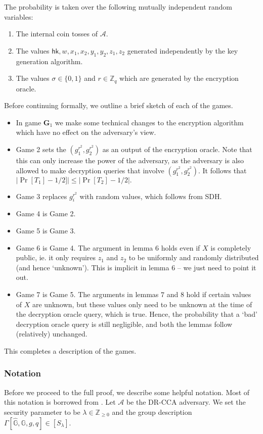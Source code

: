 \documentclass[10pt,a4paper]{article}
\newcommand{\adv}{\mathcal{A}}
\newcommand{\G}{\mathbb{G}}
\newcommand{\hk}{\mathsf{hk}}
\newcommand{\game}{\mathbf{G}}
\newcommand{\Z}{\mathbb{Z}}
\begin{document}
	The probability is taken over the following mutually independent random variables:	\begin{enumerate}
		\item The internal coin tosses of $\adv$.
		\item The values $\hk,w,x_1,x_2,y_1,y_2,z_1,z_2$ generated independently by the key generation algorithm.
		\item The values $\sigma\in\{0,1\}$ and $r\in\Z_q$ which are generated by the encryption oracle.
	\end{enumerate}
	
	Before continuing formally, we outline a brief sketch of each of the games.
	
	\begin{itemize}
		\item In game $\game_1$ we make some technical changes to the encryption algorithm which have no effect on the adversary's view.
		\item Game 2 sets the $(g_1^{r^2}, g_2^{r^2})$ as an output of the encryption oracle. Note that this can only increase the power of the adversary, as the adversary is also allowed to make decryption queries that involve $(g_1^{r^2}, g_2^{r^2})$. It follows that $|\Pr[T_1]-1/2]|\leq|\Pr[T_2]-1/2|.$
		\item Game 3 replaces $g_i^{r^2}$ with random values, which follows from SDH.
		\item Game 4 is Game 2.
		\item Game 5 is Game 3.
		\item Game 6 is Game 4. The argument in lemma $6$ holds even if $X$ is completely public, ie. it only requires $z_1$ and $z_2$ to be uniformly and randomly distributed (and hence `unknown'). This is implicit in lemma $6$ --  we just need to point it out.
		\item Game 7 is Game 5. The arguments in lemmas $7$ and $8$ hold if certain values of $X$ are unknown, but these values only need to be unknown at the time of the decryption oracle query, which is true. Hence, the probability that a `bad' decryption oracle query is still negligible, and both the lemmas follow (relatively) unchanged.
	\end{itemize}

	This completes a description of the games. 
	
	\subsubsection{Notation} Before we proceed to the full proof, we describe some helpful notation. Most of this notation is borrowed from \cite{cs01}. Let $\adv$ be the DR-CCA adversary. We set the security parameter to be $\lambda\in\Z_{\geq 0}$ and the group description $\Gamma[\hat{\G},\G,g,q]\in[S_\lambda]$.
	
\end{document}

